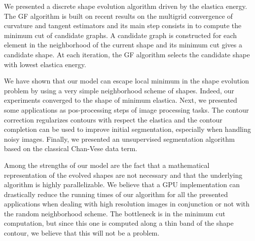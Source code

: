 \documentclass[smallextended]{svjour3}
\begin{document}
We presented a discrete shape evolution algorithm driven by the elastica energy. The GF algorithm is built on recent results on the multigrid convergence of curvature and tangent estimators and its main step consists in to compute the minimum cut of candidate graphs. A candidate graph is constructed for each element in the neighborhood of the current shape and its minimum cut gives a candidate shape. At each iteration, the GF algorithm selects the candidate shape with lowest elastica energy.

We have shown that our model can escape local minimum in the shape evolution problem by using a very simple neighborhood scheme of shapes. Indeed, our experiments converged to the shape of minimum elastica. Next, we presented some applications as pos-processing steps of image processing tasks. The contour correction regularizes contours with respect the elastica and the contour completion can be used to improve initial segmentation, especially when handling noisy images. Finally, we presented an unsupervised segmentation algorithm based on the classical Chan-Vese data term.

Among the strengths of our model are the fact that a mathematical representation of the evolved shapes are not necessary and that the underlying algorithm is highly parallelizable. We believe that a GPU implementation can drastically reduce the running times of our algorithm for all the presented applications when dealing with high resolution images in conjunction or not with the random neighborhood scheme. The bottleneck is in the minimum cut computation, but since this one is computed along a thin band of the shape contour, we believe that this will not be a problem. 




\end{document}
